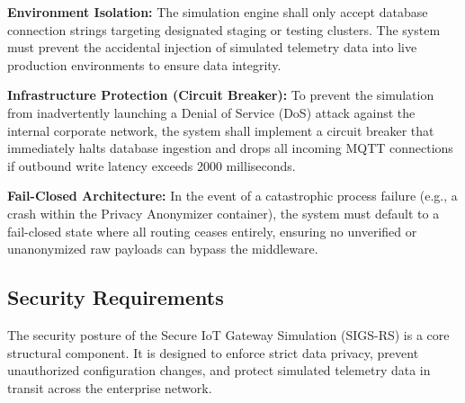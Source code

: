 \documentclass[12pt,letterpaper]{article}
\begin{document}
\vspace{0.08in}
\noindent\hspace*{0.94in} \textbf{Environment Isolation:} The simulation engine shall only accept database connection strings targeting designated staging or testing clusters. The system must prevent the accidental injection of simulated telemetry data into live production environments to ensure data integrity.\par
\vspace{0.04in}
\noindent\hspace*{0.94in} \textbf{Infrastructure Protection (Circuit Breaker):} To prevent the simulation from inadvertently launching a Denial of Service (DoS) attack against the internal corporate network, the system shall implement a circuit breaker that immediately halts database ingestion and drops all incoming MQTT connections if outbound write latency exceeds 2000 milliseconds.\par
\vspace{0.04in}
\noindent\hspace*{0.94in} \textbf{Fail-Closed Architecture:} In the event of a catastrophic process failure (e.g., a crash within the Privacy Anonymizer container), the system must default to a fail-closed state where all routing ceases entirely, ensuring no unverified or unanonymized raw payloads can bypass the middleware.\par
\subsection{Security Requirements}
The security posture of the Secure IoT Gateway Simulation (SIGS-RS) is a core structural component. It is designed to enforce strict data privacy, prevent unauthorized configuration changes, and protect simulated telemetry data in transit across the enterprise network.
\end{document}
